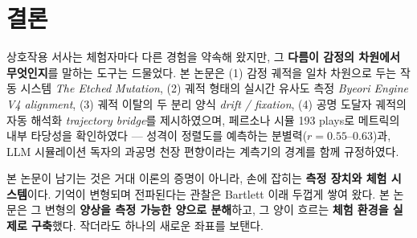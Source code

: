 \documentclass[11pt, a4paper]{article}
\begin{document}
\section{결론}
상호작용 서사는 체험자마다 다른 경험을 약속해 왔지만, 그 \textbf{다름이 감정의 차원에서 무엇인지}를 말하는 도구는 드물었다. 본 논문은 (1) 감정 궤적을 일차 차원으로 두는 작동 시스템 \textit{The Etched Mutation}, (2) 궤적 형태의 실시간 유사도 측정 \textit{Byeori Engine V4 alignment}, (3) 궤적 이탈의 두 분리 양식 \textit{drift / fixation}, (4) 공명 도달자 궤적의 자동 해석화 \textit{trajectory bridge}를 제시하였으며, 페르소나 시뮬 193 plays로 메트릭의 내부 타당성을 확인하였다 --- 성격이 정렬도를 예측하는 분별력($r=0.55$--$0.63$)과, LLM 시뮬레이션 독자의 과공명 천장 편향이라는 계측기의 경계를 함께 규정하였다.

본 논문이 남기는 것은 거대 이론의 증명이 아니라, 손에 잡히는 \textbf{측정 장치와 체험 시스템}이다. 기억이 변형되며 전파된다는 관찰은 Bartlett 이래 두껍게 쌓여 왔다. 본 논문은 그 변형의 \textbf{양상을 측정 가능한 양으로 분해}하고, 그 양이 흐르는 \textbf{체험 환경을 실제로 구축}했다. 작더라도 하나의 새로운 좌표를 보탠다.

\end{document}
